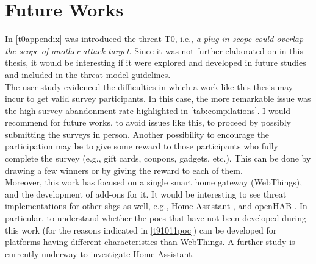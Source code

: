 \section{Future Works}
\label{sec:future}

In \autoref{t0appendix} was introduced the threat T0, i.e., \textit{a plug-in scope could overlap the scope of another attack target}. Since it was not further elaborated on in this thesis, it would be interesting if it were explored and developed in future studies and included in the threat model guidelines.\\

The user study evidenced the difficulties in which a work like this thesis may incur to get valid survey participants. In this case, the more remarkable issue was the high survey abandonment rate highlighted in \autoref{tab:compilations}. I would recommend for future works, to avoid issues like this, to proceed by possibly submitting the surveys in person. Another possibility to encourage the participation may be to give some reward to those participants who fully complete the survey (e.g., gift cards, coupons, gadgets, etc.). This can be done by drawing a few winners or by giving the reward to each of them.\\

Moreover, this work has focused on a single smart home gateway (WebThings), and the development of add-ons for it. It would be interesting to see threat implementations for other \glspl{shg} as well, e.g., Home Assistant \cite{homehomeassistant}, and openHAB \cite{openhabhomepage}. In particular, to understand whether the \glspl{poc} that have not been developed during this work (for the reasons indicated in \autoref{t91011poc}) can be developed for platforms having different characteristics than WebThings.
A further study is currently underway to investigate Home Assistant.
